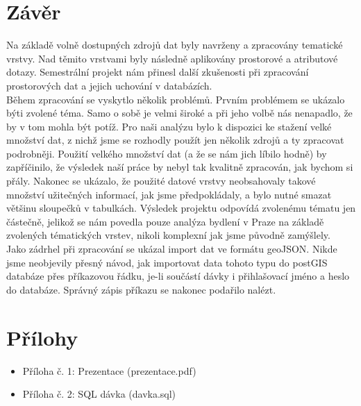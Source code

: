 \documentclass[a4paper, 12pt]{article}
\begin{document}
\clearpage

\section{Závěr}
Na základě volně dostupných zdrojů dat byly navrženy a zpracovány tematické vrstvy. Nad těmito vrstvami byly následně aplikovány prostorové a atributové dotazy. Semestrální projekt nám přinesl další zkušenosti při zpracování prostorových dat a jejich uchování v databázích.\\

Během zpracování se vyskytlo několik problémů. Prvním problémem se ukázalo býti zvolené téma. Samo o sobě je velmi široké a při jeho volbě nás nenapadlo, že by v tom mohla být potíž. Pro naši analýzu bylo k dispozici ke stažení velké množství dat, z nichž jsme se rozhodly použít jen několik zdrojů a ty zpracovat podrobněji. Použití velkého množství dat (a že se nám jich líbilo hodně) by zapříčinilo, že výsledek naší práce by nebyl tak kvalitně zpracován, jak bychom si přály. Nakonec se ukázalo, že použité datové vrstvy neobsahovaly takové množství užitečných informací, jak jsme předpokládaly, a bylo nutné smazat většinu sloupečků v tabulkách. Výsledek projektu odpovídá zvolenému tématu jen částečně, jelikož se nám povedla pouze analýza bydlení v Praze na základě zvolených tématických vrstev, nikoli komplexní jak jsme původně zamýšlely.\\

Jako zádrhel při zpracování se ukázal import dat ve formátu geoJSON. Nikde jsme neobjevily přesný návod, jak importovat data tohoto typu do postGIS databáze přes příkazovou řádku, je-li součástí dávky i přihlašovací jméno a heslo do databáze. Správný zápis příkazu se nakonec podařilo nalézt. 
\clearpage

\section{Přílohy} 

\begin{itemize}
\item Příloha č. 1: Prezentace (prezentace.pdf)
\item Příloha č. 2: SQL dávka (davka.sql)
\end{itemize}

\clearpage
\end{document}
